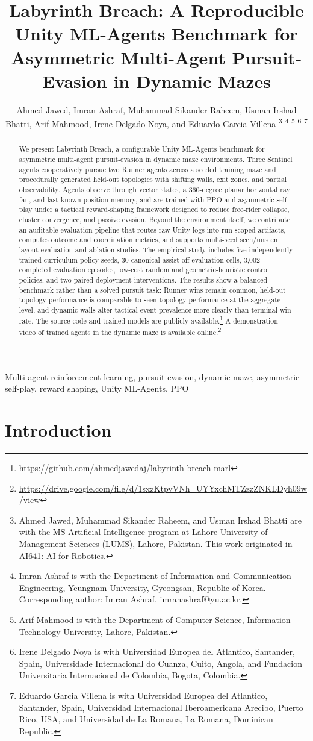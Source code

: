 \documentclass[journal]{IEEEtran}
\title{Labyrinth Breach: A Reproducible Unity ML-Agents Benchmark for Asymmetric Multi-Agent Pursuit-Evasion in Dynamic Mazes}
\author{Ahmed Jawed, Imran Ashraf, Muhammad Sikander Raheem, Usman Irshad Bhatti, Arif Mahmood, Irene Delgado Noya, and Eduardo Garcia Villena%
\thanks{Ahmed Jawed, Muhammad Sikander Raheem, and Usman Irshad Bhatti are with the MS Artificial Intelligence program at Lahore University of Management Sciences (LUMS), Lahore, Pakistan. This work originated in AI641: AI for Robotics.}%
\thanks{Imran Ashraf is with the Department of Information and Communication Engineering, Yeungnam University, Gyeongsan, Republic of Korea. Corresponding author: Imran Ashraf, imranashraf@yu.ac.kr.}%
\thanks{Arif Mahmood is with the Department of Computer Science, Information Technology University, Lahore, Pakistan.}%
\thanks{Irene Delgado Noya is with Universidad Europea del Atlantico, Santander, Spain, Universidade Internacional do Cuanza, Cuito, Angola, and Fundacion Universitaria Internacional de Colombia, Bogota, Colombia.}%
\thanks{Eduardo Garcia Villena is with Universidad Europea del Atlantico, Santander, Spain, Universidad Internacional Iberoamericana Arecibo, Puerto Rico, USA, and Universidad de La Romana, La Romana, Dominican Republic.}}
\begin{document}
\maketitle

\begin{abstract}
We present Labyrinth Breach, a configurable Unity ML-Agents benchmark for asymmetric multi-agent pursuit-evasion in dynamic maze environments. Three Sentinel agents cooperatively pursue two Runner agents across a seeded training maze and procedurally generated held-out topologies with shifting walls, exit zones, and partial observability. Agents observe through vector states, a 360-degree planar horizontal ray fan, and last-known-position memory, and are trained with PPO and asymmetric self-play under a tactical reward-shaping framework designed to reduce free-rider collapse, cluster convergence, and passive evasion. Beyond the environment itself, we contribute an auditable evaluation pipeline that routes raw Unity logs into run-scoped artifacts, computes outcome and coordination metrics, and supports multi-seed seen/unseen layout evaluation and ablation studies. The empirical study includes five independently trained curriculum policy seeds, 30 canonical assist-off evaluation cells, 3,002 completed evaluation episodes, low-cost random and geometric-heuristic control policies, and two paired deployment interventions. The results show a balanced benchmark rather than a solved pursuit task: Runner wins remain common, held-out topology performance is comparable to seen-topology performance at the aggregate level, and dynamic walls alter tactical-event prevalence more clearly than terminal win rate. The source code and trained models are publicly available.\footnote{\url{https://github.com/ahmedjawedaj/labyrinth-breach-marl}} A demonstration video of trained agents in the dynamic maze is available online.\footnote{\url{https://drive.google.com/file/d/1sxzKtpvVNh_UYYxchMTZzzZNKLDyh09w/view}}
\end{abstract}

\begin{IEEEkeywords}
Multi-agent reinforcement learning, pursuit-evasion, dynamic maze, asymmetric self-play, reward shaping, Unity ML-Agents, PPO
\end{IEEEkeywords}

\section{Introduction}
\end{document}
